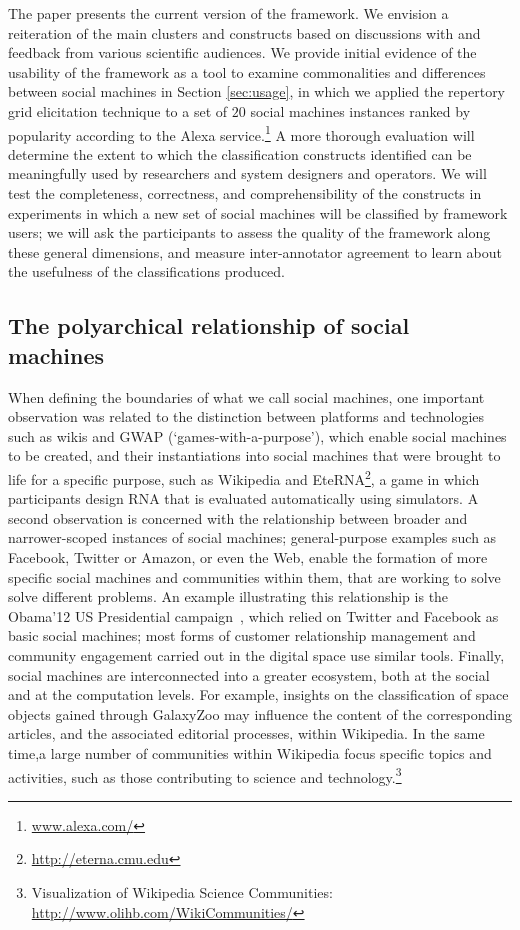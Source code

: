 \documentclass{sig-alternate}
\begin{document}
The paper presents the current version of the framework. We envision a reiteration of the main clusters and constructs based on discussions with and feedback from various scientific audiences. We provide initial evidence of the usability of the framework as a tool to examine commonalities and differences between social machines in Section \ref{sec:usage}, in which we applied the repertory grid elicitation technique to a set of $20$ social machines instances ranked by popularity according to the Alexa service.\footnote{\url{www.alexa.com/}} A more thorough evaluation will determine the extent to which the classification constructs identified can be meaningfully used by researchers and system designers and operators. We will test the completeness, correctness, and comprehensibility of the constructs in experiments in which a new set of social machines will be classified by framework users; we will ask the participants to assess the quality of the framework along these general dimensions, and measure inter-annotator agreement to learn about the usefulness of the classifications produced.

\subsection{The polyarchical relationship of social machines}
When defining the boundaries of what we call social machines, one important observation was related to the distinction between platforms and technologies such as wikis and GWAP (`games-with-a-purpose'), which enable social machines to be created, and their instantiations into social machines that were brought to life for a specific purpose, such as Wikipedia and EteRNA\footnote{\url{http://eterna.cmu.edu}}, a game in which participants design RNA that is evaluated automatically using simulators. A second observation is concerned with the relationship between broader and narrower-scoped instances of social machines; general-purpose examples such as Facebook, Twitter or Amazon, or even the Web, enable the formation of more specific social machines and communities within them, that are working to solve solve different problems. An example illustrating this relationship is the Obama'12 US Presidential campaign~\cite{obamakieron}, which relied on Twitter and Facebook as basic social machines; most forms of customer relationship management and community engagement carried out in the digital space use similar tools. Finally, social machines are interconnected into a greater ecosystem, both at the social and at the computation levels. For example, insights on the classification of space objects gained through GalaxyZoo may influence the content of the corresponding articles, and the associated editorial processes, within Wikipedia. In the same time,a large number of communities within Wikipedia focus specific topics and activities, such as those contributing to science and technology.\footnote{Visualization of Wikipedia Science Communities: \url{http://www.olihb.com/WikiCommunities/}}
\end{document}
